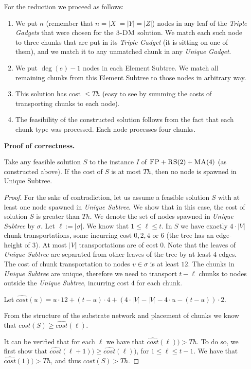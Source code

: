 \documentclass[preprint,12pt]{elsarticle}
\newcommand{\FP}{\textsc{FP}}
\newcommand{\RS}{\textsc{RS}}
\newcommand{\MA}{\textsc{MA}}
\newcommand{\Solution}{S}
\newcommand{\CostSol}{\textit{cost}(\Solution)}
\newcommand{\CostEstimOne}{\widehat{cost}}
\newcommand{\numNodes}{\ensuremath{|V|}}
\newcommand{\UnqSubtree}{{{\emph{Unique Subtree}}}}
\newcommand{\TripleGadget}{{\emph{Triple Gadget}}}
\newcommand{\TripleGadgets}{{\emph{Triple Gadgets}}}
\newcommand{\UnqGadget}{{\emph{Unique Gadget}}}
\newcommand{\SpawnedUnqSubtree}{\sigma}
\newcommand{\TDM}{\textsc{3-DM}}
\newcommand{\Thr}{\ensuremath{Th}}
\begin{document}
For the reduction we proceed as follows:
\begin{enumerate}
  \item We put $n$ (remember that $n=|X|=|Y|=|Z|$) nodes in any leaf
  of the {\TripleGadgets} that were chosen for the $\TDM$ solution. We
  match each such node to three chunks that are put in its
  {\TripleGadget} (it is sitting on one of them), and we match it to
  any unmatched chunk in any \UnqGadget.
  \item We put $\deg(e)-1$ nodes in each Element Subtree. We match all
  remaining chunks from this Element Subtree to those nodes in
  arbitrary way.
  \item This solution has cost $\leq \Thr$ (easy to see by summing the
  costs of transporting chunks to each node).
  \item The feasibility of the constructed solution follows from the
  fact that each chunk type was processed. Each node processes four
  chunks.
\end{enumerate}

\textbf{Proof of correctness.}
\begin{lemma}
  Take any feasible solution $\Solution$ to the instance $I$ of
  $\FP+\RS(2)+\MA(4)$ (as constructed above). If the cost of
  $\Solution$ is at most $\Thr$, then no node is spawned in Unique
  Subtree.
  \label{th:no-unique}
\end{lemma}

\begin{proof}
  For the sake of contradiction, let us assume a feasible solution
  $\Solution$ with at least one node spawned in {\UnqSubtree}. We show
  that in this case, the cost of solution $\Solution$ is greater than
  $\Thr$.  We denote the set of nodes spawned in {\UnqSubtree} by
  $\SpawnedUnqSubtree$. Let $\ell := |\SpawnedUnqSubtree|$. We know
  that $1 \leq \ell \leq t$.  In $\Solution$ we have exactly
  $4 \cdot \numNodes$ chunk transportations, some incurring cost
  $0, 2, 4$ or $6$ (the tree has an edge-height of $3$). At most
  $\numNodes$ transportations are of cost $0$. Note that the leaves of
  {\UnqSubtree} are separated from other leaves of the tree by at
  least $4$ edges.  The cost of chunk transportation to nodes
  $v \in \SpawnedUnqSubtree$ is at least $12$. The chunks in
  {\UnqSubtree} are unique, therefore we need to transport $t - \ell$
  chunks to nodes outside the \UnqSubtree, incurring cost $4$ for each
  chunk.

 
  Let
  $\CostEstimOne(u) = u \cdot 12 + (t-u)\cdot 4 + (4\cdot \numNodes -
  \numNodes - 4\cdot u - (t-u))\cdot 2$.

    
  From the structure of the substrate network and placement of chunks
  we know that $\CostSol \geq \CostEstimOne(\ell)$.

  It can be verified that for each $\ell$ we have that
  $\CostEstimOne(\ell)) > \Thr$. To do so, we first show that
  $\CostEstimOne(\ell+1)) \geq \CostEstimOne(\ell))$, for
  $1\leq \ell \leq t-1$. We have that $\CostEstimOne(1)) > \Thr$, and
  thus $\CostSol > \Thr$.
\end{proof}
\end{document}
